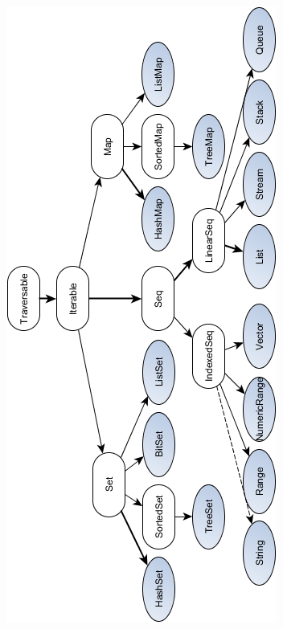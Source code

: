 \documentclass[a4paper,twoside,10pt,landscape]{article}
\begin{document}
\begin{multicols}{3}
\begin{center}
    \includegraphics[scale=.65]{scala-collection-immutable.png}
    \label{fig:scala-collection-immutable}
\end{center}


\end{multicols}
\end{document}

